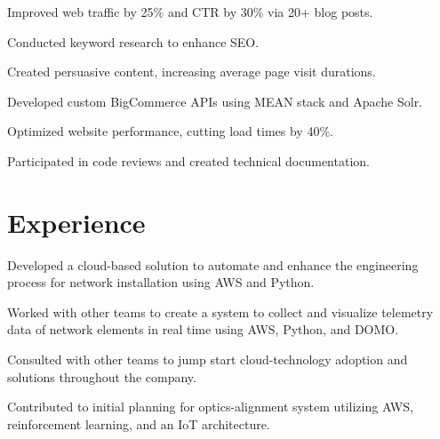 \documentclass[]{deedy-resume-reversed}
\begin{document}
\begin{minipage}[t]{0.60\textwidth}
\begin{tightemize}
\item Improved web traffic by 25\% and CTR by 30\% via 20+ blog posts.
\item Conducted keyword research to enhance SEO.
\item Created persuasive content, increasing average page visit durations.
\end{tightemize}
\sectionsep

\begin{tightemize}
\item Developed custom BigCommerce APIs using MEAN stack and Apache Solr.
\item Optimized website performance, cutting load times by 40\%.
\item Participated in code reviews and created technical documentation.
\end{tightemize}
\sectionsep


\section{Experience}
\vspace{\topsep} %
\begin{tightemize}
\item Developed a cloud-based solution to automate and enhance the engineering process for network installation using AWS and Python.
\item Worked with other teams to create a system to collect and visualize telemetry data of network elements in real time using AWS, Python, and DOMO.
\item Consulted with other teams to jump start cloud-technology adoption and solutions throughout the company.
\item Contributed to initial planning for optics-alignment system utilizing AWS, reinforcement learning, and an IoT architecture.
\end{tightemize}
\sectionsep


\end{minipage}
\end{document}
